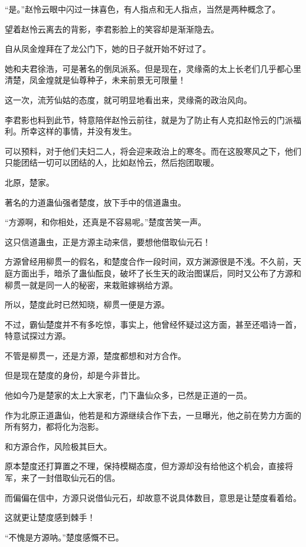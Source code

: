 \begin{this_body}
“是。”赵怜云眼中闪过一抹喜色，有人指点和无人指点，当然是两种概念了。

望着赵怜云离去的背影，李君影脸上的笑容却是渐渐隐去。

自从凤金煌拜在了龙公门下，她的日子就开始不好过了。

她和夫君徐浩，可是著名的倒凤派系。但是现在，灵缘斋的太上长老们几乎都心里清楚，凤金煌就是仙尊种子，未来前景无可限量！

这一次，流芳仙姑的态度，就可明显地看出来，灵缘斋的政治风向。

李君影也料到此节，特意陪伴赵怜云前往，就是为了防止有人克扣赵怜云的门派福利。所幸这样的事情，并没有发生。

可以预料，对于他们夫妇二人，将会迎来政治上的寒冬。而在这股寒风之下，他们只能团结一切可以团结的人，比如赵怜云，然后抱团取暖。

北原，楚家。

著名的力道蛊仙强者楚度，放下手中的信道蛊虫。

“方源啊，和你相处，还真是不容易呢。”楚度苦笑一声。

这只信道蛊虫，正是方源主动来信，要想他借取仙元石！

方源曾经用柳贯一的假名，和楚度合作一段时间，双方渊源很是不浅。不久前，天庭方面出手，暗杀了蛊仙酝良，破坏了长生天的政治图谋后，同时又公布了方源和柳贯一就是同一人的秘密，来栽赃嫁祸给方源。

所以，楚度此时已然知晓，柳贯一便是方源。

不过，霸仙楚度并不有多吃惊，事实上，他曾经怀疑过这方面，甚至还唱诗一首，特意试探过方源。

不管是柳贯一，还是方源，楚度都想和对方合作。

但是现在楚度的身份，却是今非昔比。

他如今乃是楚家的太上大家老，门下蛊仙众多，已然是正道的一员。

作为北原正道蛊仙，他若是和方源继续合作下去，一旦曝光，他之前在势力方面的所有努力，都将化为泡影。

和方源合作，风险极其巨大。

原本楚度还打算置之不理，保持模糊态度，但方源却没有给他这个机会，直接将军，来了一封借取仙元石的信。

而偏偏在信中，方源只说借仙元石，却故意不说具体数目，意思是让楚度看着给。

这就更让楚度感到棘手！

“不愧是方源呐。”楚度感慨不已。

\end{this_body}

